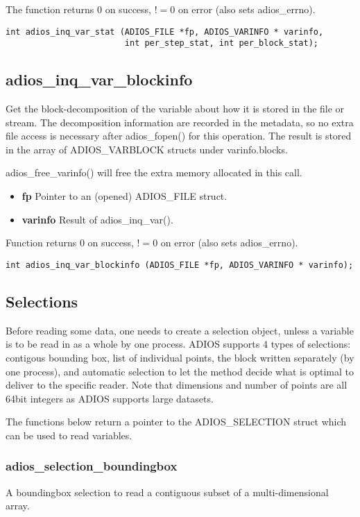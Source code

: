 \noindent The function returns 0 on success, $!=0$ on error (also sets adios\_errno). 

\begin{lstlisting}[alsolanguage=C]
int adios_inq_var_stat (ADIOS_FILE *fp, ADIOS_VARINFO * varinfo,
                        int per_step_stat, int per_block_stat);
\end{lstlisting}

\subsection{adios\_inq\_var\_blockinfo}
Get the block-decomposition of the variable about how it is stored in 
the file or stream. The decomposition information are recorded in the
metadata, so no extra file access is necessary after adios\_fopen() for 
this operation. The result is stored in the array of 
ADIOS\_VARBLOCK structs under varinfo.blocks. 

adios\_free\_varinfo() will free the extra memory allocated in this call.
\begin{itemize} 
\item{\bf fp}       Pointer to an (opened) ADIOS\_FILE struct.
\item{\bf varinfo}  Result of adios\_inq\_var(). 
\end{itemize}
Function returns 0 on success, $!=0$ on error (also sets adios\_errno).

\begin{lstlisting}[alsolanguage=C]
int adios_inq_var_blockinfo (ADIOS_FILE *fp, ADIOS_VARINFO * varinfo);
\end{lstlisting}


%
%
\subsection{Selections}
Before reading some data, one needs to create a selection object, unless a variable is to be read in 
as a whole by one process. ADIOS supports 4 types of selections: contigous bounding box, list of 
individual points, the block written separately (by one process), and automatic selection to let the 
method decide what is optimal to deliver to the specific reader. Note that dimensions and number 
of points are all 64bit integers as ADIOS supports large datasets. 

The functions below return a pointer to the ADIOS\_SELECTION struct which can be used to read variables.
 

\subsubsection{adios\_selection\_boundingbox}
A boundingbox selection to read a contiguous subset of a multi-dimensional array.

